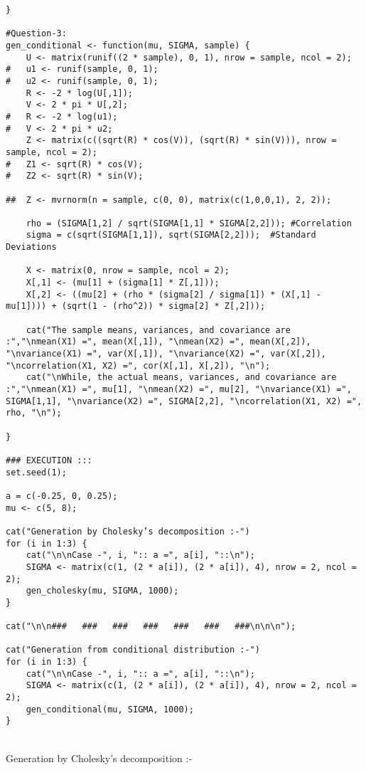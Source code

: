 \documentclass[11pt]{article}
\begin{document}
\begin{lstlisting}
}

#Question-3:
gen_conditional <- function(mu, SIGMA, sample) {
	U <- matrix(runif((2 * sample), 0, 1), nrow = sample, ncol = 2);
#	u1 <- runif(sample, 0, 1);
#	u2 <- runif(sample, 0, 1);
	R <- -2 * log(U[,1]);
	V <- 2 * pi * U[,2];
#	R <- -2 * log(u1);
#	V <- 2 * pi * u2;
	Z <- matrix(c((sqrt(R) * cos(V)), (sqrt(R) * sin(V))), nrow = sample, ncol = 2);
#	Z1 <- sqrt(R) * cos(V);
#	Z2 <- sqrt(R) * sin(V);

##	Z <- mvrnorm(n = sample, c(0, 0), matrix(c(1,0,0,1), 2, 2));

	rho = (SIGMA[1,2] / sqrt(SIGMA[1,1] * SIGMA[2,2]));	#Correlation
	sigma = c(sqrt(SIGMA[1,1]), sqrt(SIGMA[2,2]));	#Standard Deviations

	X <- matrix(0, nrow = sample, ncol = 2);
	X[,1] <- (mu[1] + (sigma[1] * Z[,1]));
	X[,2] <- ((mu[2] + (rho * (sigma[2] / sigma[1]) * (X[,1] - mu[1]))) + (sqrt(1 - (rho^2)) * sigma[2] * Z[,2]));

	cat("The sample means, variances, and covariance are :","\nmean(X1) =", mean(X[,1]), "\nmean(X2) =", mean(X[,2]), "\nvariance(X1) =", var(X[,1]), "\nvariance(X2) =", var(X[,2]), "\ncorrelation(X1, X2) =", cor(X[,1], X[,2]), "\n");
	cat("\nWhile, the actual means, variances, and covariance are :","\nmean(X1) =", mu[1], "\nmean(X2) =", mu[2], "\nvariance(X1) =", SIGMA[1,1], "\nvariance(X2) =", SIGMA[2,2], "\ncorrelation(X1, X2) =", rho, "\n");

}

### EXECUTION :::
set.seed(1);

a = c(-0.25, 0, 0.25);
mu <- c(5, 8);

cat("Generation by Cholesky’s decomposition :-")
for (i in 1:3) {
	cat("\n\nCase -", i, ":: a =", a[i], "::\n");
	SIGMA <- matrix(c(1, (2 * a[i]), (2 * a[i]), 4), nrow = 2, ncol = 2);
	gen_cholesky(mu, SIGMA, 1000);
}

cat("\n\n###   ###   ###   ###   ###   ###   ###\n\n\n");

cat("Generation from conditional distribution :-")
for (i in 1:3) {
	cat("\n\nCase -", i, ":: a =", a[i], "::\n");
	SIGMA <- matrix(c(1, (2 * a[i]), (2 * a[i]), 4), nrow = 2, ncol = 2);
	gen_conditional(mu, SIGMA, 1000);
}
\end{lstlisting}
\newpage
{}\\
Generation by Cholesky's decomposition :-
\end{document}
